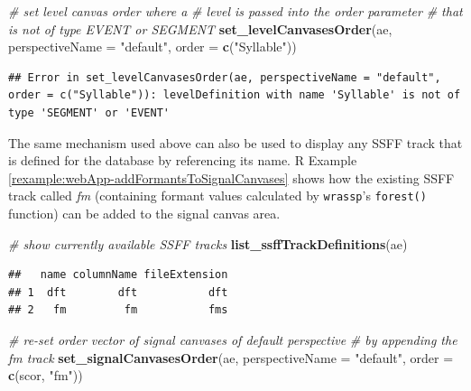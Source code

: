 \documentclass[]{book}
\newenvironment{Shaded}{\begin{snugshade}}{\end{snugshade}}
\newcommand{\CommentTok}[1]{\textcolor[rgb]{0.56,0.35,0.01}{\textit{#1}}}
\newcommand{\DataTypeTok}[1]{\textcolor[rgb]{0.13,0.29,0.53}{#1}}
\newcommand{\KeywordTok}[1]{\textcolor[rgb]{0.13,0.29,0.53}{\textbf{#1}}}
\newcommand{\NormalTok}[1]{#1}
\newcommand{\StringTok}[1]{\textcolor[rgb]{0.31,0.60,0.02}{#1}}
\theoremstyle{definition}
\theoremstyle{definition}
\theoremstyle{definition}
\theoremstyle{remark}
\begin{document}
\begin{Shaded}
\begin{Highlighting}[]
\CommentTok{# set level canvas order where a}
\CommentTok{# level is passed into the order parameter}
\CommentTok{# that is not of type EVENT or SEGMENT}
\KeywordTok{set_levelCanvasesOrder}\NormalTok{(ae,}
                       \DataTypeTok{perspectiveName =} \StringTok{"default"}\NormalTok{,}
                       \DataTypeTok{order =} \KeywordTok{c}\NormalTok{(}\StringTok{"Syllable"}\NormalTok{))}
\end{Highlighting}
\end{Shaded}

\begin{verbatim}
## Error in set_levelCanvasesOrder(ae, perspectiveName = "default", order = c("Syllable")): levelDefinition with name 'Syllable' is not of type 'SEGMENT' or 'EVENT'
\end{verbatim}

The same mechanism used above can also be used to display any SSFF track
that is defined for the database by referencing its name. R Example
\ref{rexample:webApp-addFormantsToSignalCanvases} shows how the existing
SSFF track called \emph{fm} (containing formant values calculated by
\texttt{wrassp}'s \texttt{forest()} function) can be added to the signal
canvas area.

\begin{Shaded}
\begin{Highlighting}[]
\CommentTok{# show currently available SSFF tracks}
\KeywordTok{list_ssffTrackDefinitions}\NormalTok{(ae)}
\end{Highlighting}
\end{Shaded}

\begin{verbatim}
##   name columnName fileExtension
## 1  dft        dft           dft
## 2   fm         fm           fms
\end{verbatim}

\begin{Shaded}
\begin{Highlighting}[]
\CommentTok{# re-set order vector of signal canvases of default perspective}
\CommentTok{# by appending the fm track}
\KeywordTok{set_signalCanvasesOrder}\NormalTok{(ae,}
                        \DataTypeTok{perspectiveName =} \StringTok{"default"}\NormalTok{,}
                        \DataTypeTok{order =} \KeywordTok{c}\NormalTok{(scor, }\StringTok{"fm"}\NormalTok{))}
\end{Highlighting}
\end{Shaded}
\end{document}
